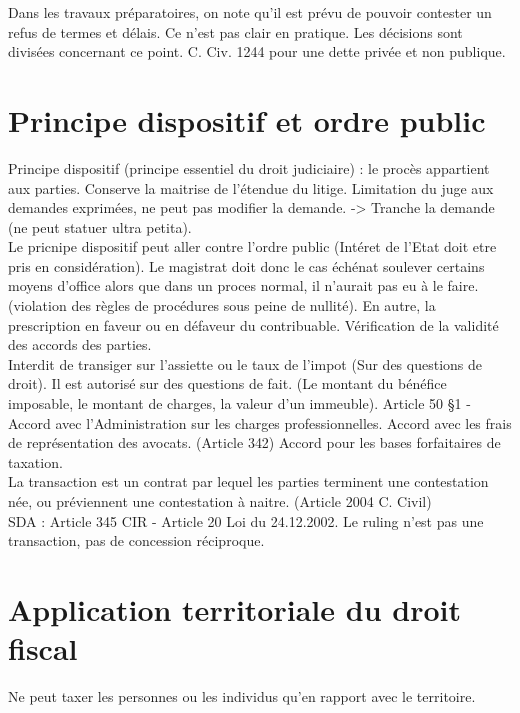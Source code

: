 \documentclass{book}
\begin{document}
Dans les travaux préparatoires, on note qu'il est prévu de pouvoir contester un refus de termes et délais. Ce n'est pas clair en pratique. Les décisions sont divisées concernant ce point. C. Civ. 1244 pour une dette privée et non publique.

\section{Principe dispositif et ordre public}

Principe dispositif (principe essentiel du droit judiciaire) : le procès appartient aux parties. Conserve la maitrise de l'étendue du litige. Limitation du juge aux demandes exprimées, ne peut pas modifier la demande. -> Tranche la demande (ne peut statuer ultra petita).\\

Le pricnipe dispositif peut aller contre l'ordre public (Intéret de l'Etat doit etre pris en considération). Le magistrat doit donc le cas échénat soulever certains moyens d'office alors que dans un proces normal, il n'aurait pas eu à le faire. (violation des règles de procédures sous peine de nullité). En autre, la prescription en faveur ou en défaveur du contribuable. Vérification de la validité des accords des parties.\\

Interdit de transiger sur l'assiette ou le taux de l'impot (Sur des questions de droit). Il est autorisé sur des questions de fait. (Le montant du bénéfice imposable, le montant de charges, la valeur d'un immeuble). Article 50 §1 - Accord avec l'Administration sur les charges professionnelles. Accord avec les frais de représentation des avocats. (Article 342) Accord pour les bases forfaitaires de taxation.\\

La transaction est un contrat par lequel les parties terminent une contestation née, ou préviennent une contestation à naitre. (Article 2004 C. Civil)\\

SDA : Article 345 CIR - Article 20 Loi du 24.12.2002. Le ruling n'est pas une transaction, pas de concession réciproque.\\

\section{Application territoriale du droit fiscal}

Ne peut taxer les personnes ou les individus qu'en rapport avec le territoire.\\
\end{document}
